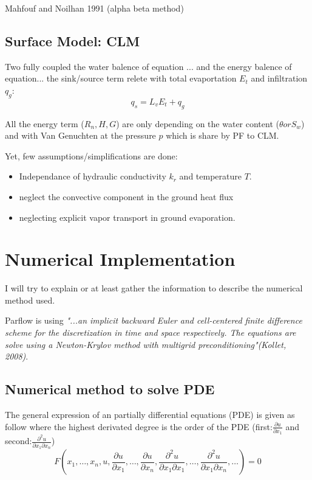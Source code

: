 \documentclass[11pt,a4paper]{report}
\begin{document}
Mahfouf and Noilhan 1991 (alpha beta method)


\section{Surface Model: CLM}
Two fully coupled the water balence of equation ... and the energy balence of equation... the sink/source term relete with total evaportation $E_t$ and infiltration $q_g$:
\begin{equation}
q_s=L_vE_t + q_g
\end{equation}

All the energy term ($R_n, H, G$) are only depending on the water content ($\theta or S_w$) and with Van Genuchten at the pressure $p$ which is share by PF to CLM.

Yet, few assumptions/simplifications are done:
\begin{itemize}
\item Independance of hydraulic conductivity $k_r$ and temperature $T$.
\item neglect the convective component in the ground heat flux
\item neglecting explicit vapor transport in ground evaporation.
\end{itemize}










\chapter{Numerical Implementation}
I will try to explain or at least gather the information to describe the numerical method used.

Parflow is using \textit{"...an implicit backward Euler and cell-centered finite difference scheme for the discretization in time and space respectively. The equations are solve using a Newton-Krylov method with multigrid preconditioning"(Kollet, 2008)}.

\section{Numerical method to solve PDE}
The general expression of an partially differential equations (PDE) is given as follow where the highest derivated degree is the order of the PDE (first:$\frac{\partial u}{\partial x_1}$ and second:$\frac{\partial^2 u}{\partial x_1 \partial x_n}$)
\begin{equation}
F \left (x_1, \ldots, x_n, u, \frac{\partial u}{\partial x_1}, \ldots, \frac{\partial u}{\partial x_n}, \frac{\partial^2 u}{\partial x_1 \partial x_1}, \ldots, \frac{\partial^2 u}{\partial x_1 \partial x_n}, \ldots \right) = 0
\end{equation}
\end{document}
